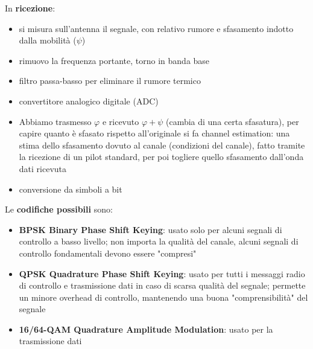 In \textbf{ricezione}: 
\begin{itemize}
	\item si misura sull'antenna il segnale, con relativo rumore e sfasamento indotto dalla mobilità ($\psi$)

	\item rimuovo la frequenza portante, torno in banda base

	\item filtro passa-basso per eliminare il rumore termico

	\item convertitore analogico digitale (ADC)

	\item Abbiamo trasmesso $\varphi$ e ricevuto $\varphi + \psi$ (cambia di una certa sfasatura), per capire quanto è sfasato rispetto all'originale si fa channel estimation: una stima dello sfasamento dovuto al canale (condizioni del canale), fatto tramite la ricezione di un pilot standard, per poi togliere quello sfasamento dall'onda dati ricevuta

	\item conversione da simboli a bit
\end{itemize}

Le \textbf{codifiche possibili} sono:
\begin{itemize}
	\item \textbf{BPSK Binary Phase Shift Keying}: usato solo per alcuni segnali di controllo a basso livello; non importa la qualità del canale, alcuni segnali di controllo fondamentali devono essere "compresi"
	
    \item \textbf{QPSK Quadrature Phase Shift Keying}: usato per tutti i messaggi radio di controllo e trasmissione dati in caso di scarsa qualità del segnale; permette un minore overhead di controllo, mantenendo una buona "comprensibilità" del segnale
	
    \item \textbf{16/64-QAM Quadrature Amplitude Modulation}: usato per la trasmissione dati
\end{itemize}

